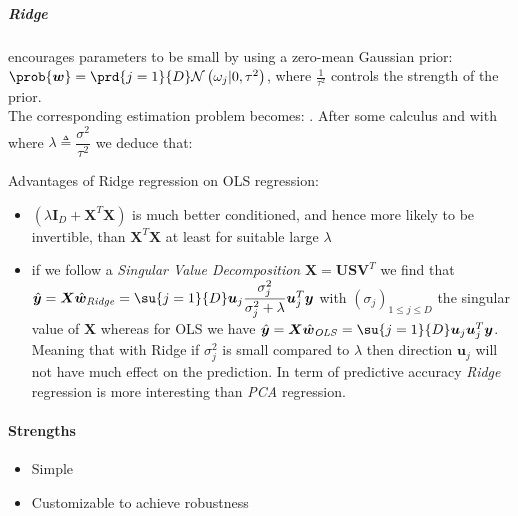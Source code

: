 \subparagraph{Ridge}
encourages parameters to be small by using a zero-mean Gaussian prior: $\prob{\bm{w}} = 
\prd{j=1}{D} \mathcal{N}\left(\omega_{j}|0, \tau^{2}\right)$, where $\frac{1}{\tau^{2}}$
controls the strength of the prior.\\
The corresponding  estimation problem becomes:
. After some calculus and with where $\lambda \triangleq 
\dfrac{\sigma^{2}}{\tau^{2}}$ we deduce that:
\begin{center}
\end{center}
Advantages of Ridge regression on OLS regression:
\begin{itemize}
    \item $\left(\lambda\bm{I}_{D}+\bm{X}^{T}\bm{X}\right)$ is much better conditioned, 
        and hence more likely to be invertible, than $\bm{X}^{T}\bm{X}$ at least for 
        suitable large $\lambda$
    \item if we follow a \emph{Singular Value Decomposition} $\bm{X} = \bm{U}\bm{S}
        \bm{V}^{T}$ we find 
        that $\hat{\bm{y}} = \bm{X}\hat{\bm{w}}_{\text{\emph{Ridge}}} = \su{j=1}{D}
        \bm{u}_{j}\dfrac{\sigma_{j}^{2}}{\sigma_{j}^{2} + \lambda}\bm{u}_{j}^{T}\bm{y}$
        with $\left(\sigma_{j}\right)_{1\leq j \leq D}$ the singular value of $\bm{X}$
        whereas for OLS we have $\hat{\bm{y}} = \bm{X}\hat{\bm{w}}_{\text{\emph{OLS}}} 
        = \su{j=1}{D} \bm{u}_{j}\bm{u}_{j}^{T}\bm{y}$. Meaning that with Ridge if 
        $\sigma_{j}^{2}$ is small compared to $\lambda$ then direction $\bm{u}_{j}$
        will not have much effect on the prediction. In term of predictive accuracy
        \emph{Ridge} regression is more interesting than \emph{PCA} regression.
\end{itemize}

\paragraph{Strengths}
\begin{itemize}
    \item Simple
    \item Customizable to achieve robustness
\end{itemize}

